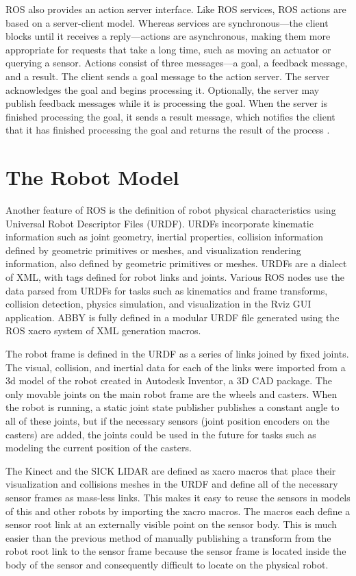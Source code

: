 \documentclass[]{cwru} %
\begin{document}
ROS also provides an action server interface. Like ROS services, ROS
actions are based on a server-client model. Whereas services are
synchronous---the client blocks until it receives a reply---actions are
asynchronous, making them more appropriate for requests that take a long
time, such as moving an actuator or querying a sensor. Actions consist
of three messages---a goal, a feedback message, and a result. The client
sends a goal message to the action server. The server acknowledges the
goal and begins processing it. Optionally, the server may publish
feedback messages while it is processing the goal. When the server is
finished processing the goal, it sends a result message, which notifies
the client that it has finished processing the goal and returns the
result of the process \cite{ros_actionlib}.

\section{The Robot Model}

Another feature of ROS is the definition of robot physical
characteristics using Universal Robot Descriptor Files (URDF). URDFs
incorporate kinematic information such as joint geometry, inertial
properties, collision information defined by geometric primitives or
meshes, and visualization rendering information, also defined by
geometric primitives or meshes. URDFs are a dialect of XML, with tags
defined for robot links and joints. Various ROS nodes use the data
parsed from URDFs for tasks such as kinematics and frame transforms,
collision detection, physics simulation, and visualization in the Rviz
GUI application. ABBY is fully defined in a modular URDF file generated
using the ROS xacro system of XML generation macros.

The robot frame is defined in the URDF as a series of links joined by
fixed joints. The visual, collision, and inertial data for each of the
links were imported from a 3d model of the robot created in Autodesk
Inventor, a 3D CAD package. The only movable joints on the main robot
frame are the wheels and casters. When the robot is running, a static
joint state publisher publishes a constant angle to all of these joints,
but if the necessary sensors (joint position encoders on the casters)
are added, the joints could be used in the future for tasks such as
modeling the current position of the casters.

The Kinect and the SICK LIDAR are defined as xacro macros that place
their visualization and collisions meshes in the URDF and define all of
the necessary sensor frames as mass-less links. This makes it easy to
reuse the sensors in models of this and other robots by importing the
xacro macros. The macros each define a sensor root link at an externally
visible point on the sensor body. This is much easier than the previous
method of manually publishing a transform from the robot root link to
the sensor frame because the sensor frame is located inside the body of
the sensor and consequently difficult to locate on the physical robot.
\end{document}
